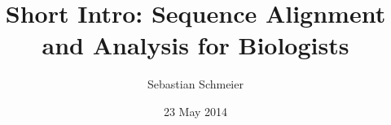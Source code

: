 \title{Short Intro: Sequence Alignment and Analysis for Biologists}
\author{Sebastian Schmeier}
\date{23 May 2014}
\maketitle
